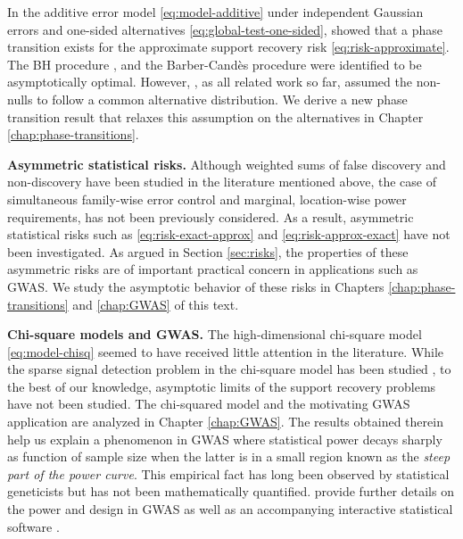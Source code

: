 In the additive error model \eqref{eq:model-additive} under independent Gaussian errors and one-sided alternatives \eqref{eq:global-test-one-sided},
\cite{arias2017distribution} showed that a phase transition exists for  the approximate support recovery risk \eqref{eq:risk-approximate}.
The \ac{BH} procedure \citep{benjamini1995controlling}, and the Barber-Cand\`es procedure \citep{barber2015controlling} were identified to be asymptotically optimal. %
However, \cite{arias2017distribution}, as all related work so far, assumed the non-nulls to follow a common alternative distribution.
We derive a new phase transition result that relaxes this assumption on the alternatives in Chapter \ref{chap:phase-transitions}.

\medskip

{\bf Asymmetric statistical risks.}
Although weighted sums of false discovery and non-discovery have been studied in the literature mentioned above, the case of simultaneous family-wise error control and marginal, location-wise power requirements, has not been previously considered. 
As a result, asymmetric statistical risks such as \eqref{eq:risk-exact-approx} and \eqref{eq:risk-approx-exact} have not 
been investigated.
As argued in Section \ref{sec:risks}, the properties of these asymmetric risks are of important practical concern in applications such as GWAS.
We study the asymptotic behavior of these risks in Chapters \ref{chap:phase-transitions} and \ref{chap:GWAS} of this text.

\medskip

{\bf Chi-square models and GWAS.}
The high-dimensional chi-square model \eqref{eq:model-chisq} seemed to have received little attention in the literature.
While the sparse signal detection problem in the chi-square model has been studied \cite{donoho2004higher}, to the best of our knowledge,  asymptotic limits of the support recovery problems have not been studied.
The chi-squared model and the motivating GWAS application are analyzed in Chapter \ref{chap:GWAS}.
The results obtained therein help us explain a phenomenon in GWAS where statistical power decays sharply as function of sample size when the latter is in a small region known as the {\em steep part of the power curve}.  
This empirical fact has long been observed by statistical geneticists but has not been mathematically quantified.  \cite{gao2019upass} provide further details on the power and design in GWAS as well as an accompanying interactive statistical software \citep{gaoUPASS_ShinyApp}.

